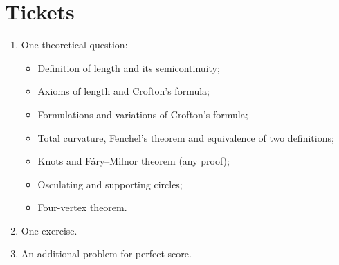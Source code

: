 \chapter{Tickets}


\begin{enumerate}
 \item One theoretical question:
\begin{itemize}
 \item Definition of length and its semicontinuity;
 \item Axioms of length and Crofton's formula;
 \item Formulations and variations of Crofton's formula;
 \item Total curvature, Fenchel's theorem and equivalence of two definitions;
 \item Knots and F\'ary--Milnor theorem (any proof);
 \item Osculating and supporting circles;
 \item Four-vertex theorem.
\end{itemize}

\item One exercise.

\item An additional problem for perfect score.
\end{enumerate}

